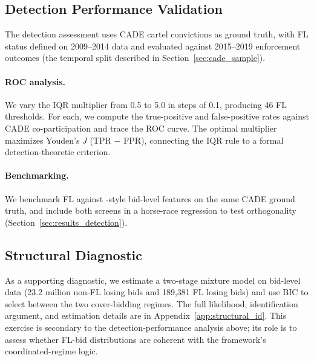 
\subsection{Detection Performance Validation}
\label{sec:detection_validation}

The detection assessment uses CADE cartel convictions as ground truth,
with FL status defined on 2009--2014 data and evaluated against
2015--2019 enforcement outcomes (the temporal split described in
Section~\ref{sec:cade_sample}).

\paragraph{ROC analysis.}
We vary the IQR multiplier from 0.5 to 5.0 in steps of 0.1, producing
46 FL thresholds. For each, we compute the true-positive and
false-positive rates against CADE co-participation and trace the ROC
curve. The optimal multiplier maximizes Youden's $J$ (TPR $-$ FPR),
connecting the IQR rule to a formal detection-theoretic criterion.

\paragraph{Benchmarking.}
We benchmark FL against \citet{imhof2019detecting}-style bid-level
features on the same CADE ground truth, and include both screens in a
horse-race regression to test orthogonality
(Section~\ref{sec:results_detection}).


\subsection{Structural Diagnostic}
\label{sec:structural_estimation}

As a supporting diagnostic, we estimate a two-stage mixture model on
bid-level data (23.2 million non-FL losing bids and 189,381 FL losing
bids) and use BIC to select between the two cover-bidding regimes.
The full likelihood, identification argument, and estimation details
are in Appendix~\ref{app:structural_id}. This exercise is secondary
to the detection-performance analysis above; its role is to assess
whether FL-bid distributions are coherent with the framework's
coordinated-regime logic.


